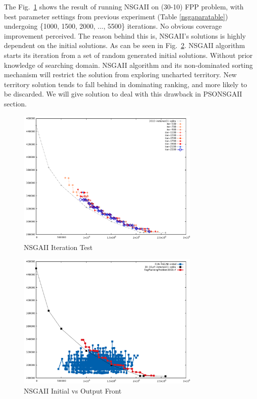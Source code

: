 \documentclass[10pt,journal,compsoc]{IEEEtran}
\newcommand{\Fig}[1]{Fig.~\ref{#1}}
\begin{document}
The \Fig{nsgaitertest} shows the result of running NSGAII on (30-10) FPP problem, with best parameter settings from previous experiment (Table \ref{nsgaparatable}) undergoing \{1000, 1500, 2000, ..., 5500\} iterations. No obvious coverage improvement perceived.
The reason behind this is, NSGAII's solutions is highly dependent on the initial solutions. As can be seen in \Fig{nsgaini}. NSGAII algorithm starts its iteration from a set of random generated initial solutions. Without prior knowledge of searching domain. NSGAII algorithm and its non-dominated sorting mechanism will restrict the solution from exploring uncharted territory. New territory solution tends to fall behind in dominating ranking, and more likely to be discarded. We will give solution to deal with this drawback in PSONSGAII section. 
\begin{figure}[H]
\centerline{\includegraphics[page=1,width=3.5in]{nsgaitertest.pdf}}
\caption{NSGAII Iteration Test} 
\label{nsgaitertest}
\end{figure}
\begin{figure}[H]
\centerline{\includegraphics[page=1,width=3.5in]{nsga-initial.pdf}}
\caption{NSGAII Initial vs Output Front} 
\label{nsgaini}
\end{figure}
\end{document}
